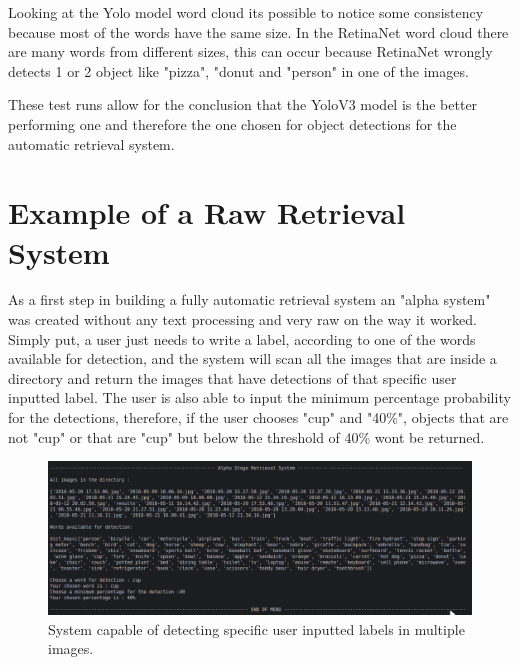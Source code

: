      Looking at the Yolo model word cloud its possible to notice some consistency because most of the words have the same size. In the RetinaNet word cloud there are many words from different sizes, this can occur because RetinaNet wrongly detects 1 or 2 object like "pizza", "donut and "person" in one of the images.

     These test runs allow for the conclusion that the YoloV3 model is the better performing one and therefore the one chosen for object detections for the automatic retrieval system. 

\section{Example of a Raw Retrieval System}
\label{sec:alpha_retrieval}

As a first step in building a fully automatic retrieval system an "alpha system" was created without any text processing and very raw on the way it worked. Simply put, a user just needs to write a label, according to one of the words available for detection, and the system will scan all the images that are inside a directory and return the images that have detections of that specific user inputted label. The user is also able to input the minimum percentage probability for the detections, therefore, if the user chooses "cup" and "40\%", objects that are not "cup" or that are "cup" but below the threshold of 40\% wont be returned.

\begin{figure}[H]
  \centering
  \includegraphics[width = \textwidth]{Sections/4InitialWork/4_images_random/alpha.png}
  \caption[Raw retrieval system]{System capable of detecting specific user inputted labels in multiple images. }
  \label{fig:yolov3} 
\end{figure}




